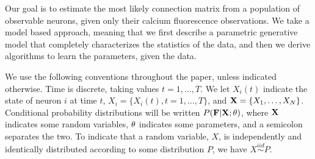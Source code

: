 Our goal is to estimate the most likely connection matrix from a population of observable neurons, given only their calcium fluorescence observations.  We take a model based approach, meaning that we first describe a parametric generative model that completely characterizes the statistics of the data, and then we derive algorithms to learn the parameters, given the data.  

We use the following conventions throughout the paper, unless indicated otherwise.  Time is discrete, taking values $t=1,\ldots,T$.  We let $X_i(t)$ indicate the state of neuron $i$ at time $t$, $X_i=\{X_i(t), t=1,\ldots, T\}$, and ${\bf X}= \{X_1, \ldots, X_N\}$.  Conditional probability distributions will be written $P(\bf F | \bf X; \mathbf{\theta})$, where $\bf X$ indicates some random variables, $\mathbf{\theta}$ indicates some parameters, and a semicolon separates the two. To indicate that a random variable, $X$, is independently and identically distributed according to some distribution $P$, we have $X \overset{iid}{\sim} P$.  


% 
% 
